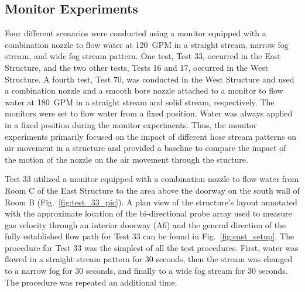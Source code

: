 \documentclass[12pt,oneside]{book}
\begin{document}
\subsection{Monitor Experiments}
\label{sec:monitor_procedure}
Four different scenarios were conducted using a monitor equipped with a combination nozzle to flow water at 120~GPM in a straight stream, narrow fog stream, and wide fog stream pattern. One test, Test 33, occurred in the East Structure, and the two other tests, Tests 16 and 17, occurred in the West Structure. A fourth test, Test 70, was conducted in the West Structure and used a combination nozzle and a smooth bore nozzle attached to a monitor to flow water at 180~GPM in a straight stream and solid stream, respectively. The monitors were set to flow water from a fixed position.  Water was always applied in a fixed position during the monitor experiments. Thus, the monitor experiments primarily focused on the impact of different hose stream patterns on air movement in a structure and provided a baseline to compare the impact of the motion of the nozzle on the air movement through the stucture.

Test 33 utilized a monitor equipped with a combination nozzle to flow water from Room C of the East Structure to the area above the doorway on the south wall of Room B (Fig.~\ref{fig:test_33_pic}). A plan view of the structure's layout annotated with the approximate location of the bi-directional probe array used to measure gas velocity through an interior doorway (A6) and the general direction of the fully established flow path for Test 33 can be found in Fig.~\ref{fig:east_setup}. The procedure for Test 33 was the simplest of all the test procedures. First, water was flowed in a straight stream pattern for 30 seconds, then the stream was changed to a narrow fog for 30 seconds, and finally to a wide fog stream for 30 seconds. The procedure was repeated an additional time.
\end{document}
